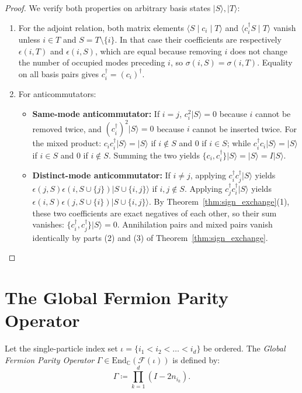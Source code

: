 \begin{proof}
We verify both properties on arbitrary basis states $|S\rangle, |T\rangle$:
\begin{enumerate}
    \item For the adjoint relation, both matrix elements $\langle S\mid c_i\mid T\rangle$ and $\langle c_i^\dagger S\mid T\rangle$ vanish unless $i\in T$ and $S=T\setminus\{i\}$. In that case their coefficients are respectively $\epsilon(i,T)$ and $\epsilon(i,S)$, which are equal because removing $i$ does not change the number of occupied modes preceding $i$, so $\sigma(i,S)=\sigma(i,T)$. Equality on all basis pairs gives $c_i^\dagger=(c_i)^\dagger$.

    \item For anticommutators:
    \begin{itemize}
        \item \textbf{Same-mode anticommutator:} If $i = j$, $c_i^2 |S\rangle = 0$ because $i$ cannot be removed twice, and $(c_i^\dagger)^2 |S\rangle = 0$ because $i$ cannot be inserted twice. For the mixed product: $c_i c_i^\dagger |S\rangle = |S\rangle$ if $i \notin S$ and $0$ if $i \in S$; while $c_i^\dagger c_i |S\rangle = |S\rangle$ if $i \in S$ and $0$ if $i \notin S$. Summing the two yields $\{c_i, c_i^\dagger\} |S\rangle = |S\rangle = I |S\rangle$.
        \item \textbf{Distinct-mode anticommutator:} If $i \neq j$, applying $c_i^\dagger c_j^\dagger |S\rangle$ yields $\epsilon(j, S) \epsilon(i, S \cup \{j\}) |S \cup \{i, j\}\rangle$ if $i, j \notin S$. Applying $c_j^\dagger c_i^\dagger |S\rangle$ yields $\epsilon(i, S) \epsilon(j, S \cup \{i\}) |S \cup \{i, j\}\rangle$. By Theorem~\ref{thm:sign_exchange}(1), these two coefficients are exact negatives of each other, so their sum vanishes: $\{c_i^\dagger, c_j^\dagger\} |S\rangle = 0$. Annihilation pairs and mixed pairs vanish identically by parts (2) and (3) of Theorem~\ref{thm:sign_exchange}.
    \end{itemize}
\end{enumerate}
\end{proof}

\section{The Global Fermion Parity Operator}

\begin{definition}
Let the single-particle index set $\iota = \{i_1 < i_2 < \dots < i_d\}$ be ordered. The \emph{Global Fermion Parity Operator} $\Gamma \in \mathrm{End}_{\mathbb{C}}(\mathcal{F}(\iota))$ is defined by:
\begin{equation}
\Gamma \coloneqq \prod_{k=1}^d (I - 2 n_{i_k}).
\end{equation}
\end{definition}

